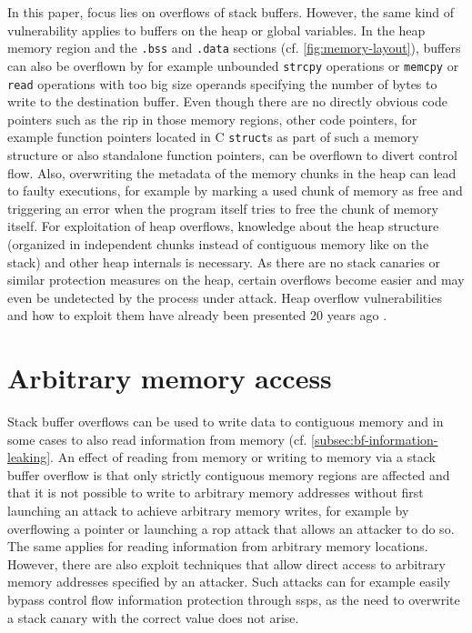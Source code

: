 In this paper, focus lies on overflows of stack buffers.
However, the same kind of vulnerability applies to buffers on the heap or global variables.
In the heap memory region and the \texttt{.bss} and \texttt{.data} sections (cf. \cref{fig:memory-layout}), buffers can also be overflown by for example unbounded \texttt{strcpy} operations or \texttt{memcpy} or \texttt{read} operations with too big size operands specifying the number of bytes to write to the destination buffer.
Even though there are no directly obvious code pointers such as the \gls{rip} in those memory regions, other code pointers, for example function pointers located in C \texttt{struct}s as part of such a memory structure or also standalone function pointers, can be overflown to divert control flow.
Also, overwriting the metadata of the memory chunks in the heap can lead to faulty executions, for example by marking a used chunk of memory as free and triggering an error when the program itself tries to free the chunk of memory itself.
For exploitation of heap overflows, knowledge about the heap structure (organized in independent chunks instead of contiguous memory like on the stack) and other heap internals is necessary.
As there are no stack canaries or similar protection measures on the heap, certain overflows become easier and may even be undetected by the process under attack.
Heap overflow vulnerabilities and how to exploit them have already been presented 20 years ago \cite{Anonymous2001,Kaempf2001,SolarDesigner2000}.

\section{Arbitrary memory access}
\label{sec:arbitrary-memory-access}

Stack buffer overflows can be used to write data to contiguous memory and in some cases to also read information from memory (cf. \cref{subsec:bf-information-leaking}.
An effect of reading from memory or writing to memory via a stack buffer overflow is that only strictly contiguous memory regions are affected and that it is not possible to write to arbitrary memory addresses without first launching an attack to achieve arbitrary memory writes, for example by overflowing a pointer or launching a \gls{rop} attack that allows an attacker to do so.
The same applies for reading information from arbitrary memory locations.
However, there are also exploit techniques that allow direct access to arbitrary memory addresses specified by an attacker.
Such attacks can for example easily bypass control flow information protection through \glspl{ssp}, as the need to overwrite a stack canary with the correct value does not arise.

